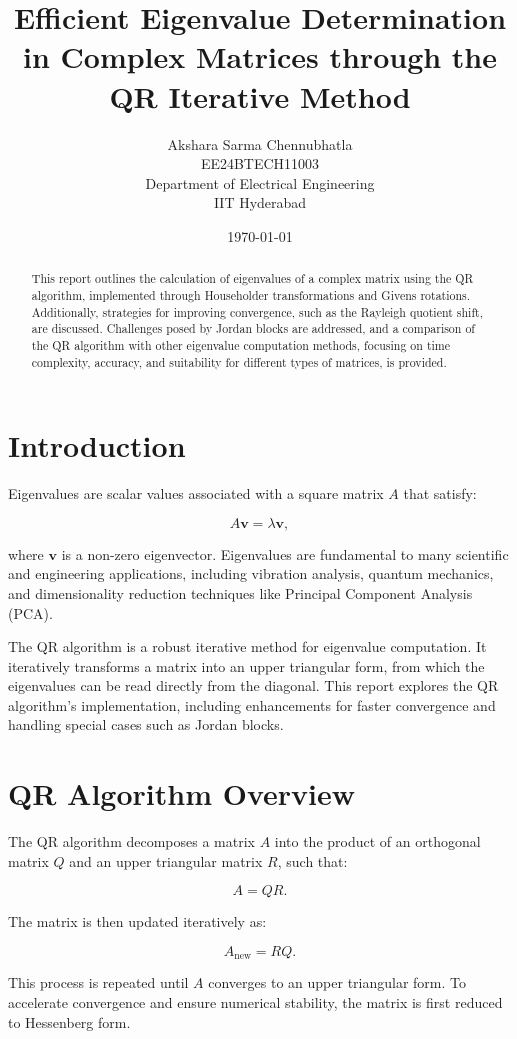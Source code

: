 \documentclass[12pt]{article}
\title{\textbf{Efficient Eigenvalue Determination in Complex Matrices through the QR Iterative Method}}
\author{Akshara Sarma Chennubhatla \\EE24BTECH11003\\ Department of Electrical Engineering \\ IIT Hyderabad}
\date{\today}
\begin{document}
\maketitle

\begin{abstract}
This report outlines the calculation of eigenvalues of a complex matrix using the QR algorithm, implemented through Householder transformations and Givens rotations. Additionally, strategies for improving convergence, such as the Rayleigh quotient shift, are discussed. Challenges posed by Jordan blocks are addressed, and a comparison of the QR algorithm with other eigenvalue computation methods, focusing on time complexity, accuracy, and suitability for different types of matrices, is provided.
\end{abstract}

\section{Introduction}
Eigenvalues are scalar values associated with a square matrix \(A\) that satisfy:

\[
A \mathbf{v} = \lambda \mathbf{v},
\]

where \(\mathbf{v}\) is a non-zero eigenvector. Eigenvalues are fundamental to many scientific and engineering applications, including vibration analysis, quantum mechanics, and dimensionality reduction techniques like Principal Component Analysis (PCA).

The QR algorithm is a robust iterative method for eigenvalue computation. It iteratively transforms a matrix into an upper triangular form, from which the eigenvalues can be read directly from the diagonal. This report explores the QR algorithm's implementation, including enhancements for faster convergence and handling special cases such as Jordan blocks.

\section{QR Algorithm Overview}
The QR algorithm decomposes a matrix \(A\) into the product of an orthogonal matrix \(Q\) and an upper triangular matrix \(R\), such that:

\[
A = QR.
\]

The matrix is then updated iteratively as:

\[
A_{\text{new}} = RQ.
\]

This process is repeated until \(A\) converges to an upper triangular form. To accelerate convergence and ensure numerical stability, the matrix is first reduced to Hessenberg form.
\end{document}
